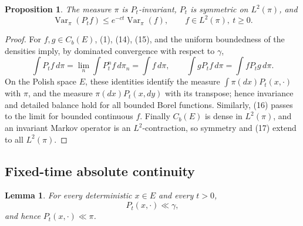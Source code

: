 \documentclass[12pt]{article}
\newtheorem{lemma}{Lemma}
\newtheorem{proposition}{Proposition}
\newcommand{\1}{\mathbf 1}
\newcommand{\Var}{\operatorname{Var}}
\begin{document}
\begin{proposition}\label{prop:gap}
The measure \(\pi\) is \(P_t\)-invariant, \(P_t\) is symmetric on
\(L^2(\pi)\), and
\[
       \Var_\pi(P_t f)\le e^{-ct}\Var_\pi(f),
       \qquad f\in L^2(\pi),\ t\ge0 .                       \tag{17}
\]
\end{proposition}

\begin{proof}
For \(f,g\in C_b(E)\), (1), (14), (15), and the uniform boundedness of the
densities imply, by dominated convergence with respect to \(\gamma\),
\[
 \int P_tf\,d\pi=\lim_n\int P_t^nf\,d\pi_n=\int f\,d\pi,\qquad
 \int gP_tf\,d\pi=\int fP_tg\,d\pi .
\]
On the Polish space \(E\), these identities identify the measure
\(\int\pi(dx)P_t(x,\cdot)\) with \(\pi\), and the measure
\(\pi(dx)P_t(x,dy)\) with its transpose; hence invariance and detailed balance
hold for all bounded Borel functions.  Similarly, (16) passes to the limit for
bounded continuous \(f\).  Finally \(C_b(E)\) is dense in \(L^2(\pi)\), and an
invariant Markov operator is an \(L^2\)-contraction, so symmetry and (17)
extend to all \(L^2(\pi)\).
\end{proof}

\subsection*{Fixed-time absolute continuity}

\begin{lemma}\label{lem:control}
For every deterministic \(x\in E\) and every \(t>0\),
\[
        P_t(x,\cdot)\ll \gamma ,
\]
and hence \(P_t(x,\cdot)\ll\pi\).
\end{lemma}
\end{document}
